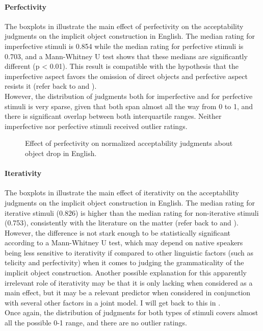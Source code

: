 \paragraph{Perfectivity}
The boxplots in  illustrate the main effect of perfectivity on the acceptability judgments on the implicit object construction in English. The median rating for imperfective stimuli is 0.854 while the median rating for perfective stimuli is 0.703, and a Mann-Whitney U test shows that these medians are significantly different (p < 0.01). This result is compatible with the hypothesis that the imperfective aspect favors the omission of direct objects and perfective aspect resists it (refer back to  and ).\\
However, the distribution of judgments both for imperfective and for perfective stimuli is very sparse, given that both span almost all the way from 0 to 1, and there is significant overlap between both interquartile ranges. Neither imperfective nor perfective stimuli received outlier ratings.

\begin{figure}[htb]
\caption{Effect of perfectivity on normalized acceptability judgments about object drop in English.}
    
\end{figure}

\paragraph{Iterativity}
The boxplots in  illustrate the main effect of iterativity on the acceptability judgments on the implicit object construction in English. The median rating for iterative stimuli (0.826) is higher than the median rating for non-iterative stimuli (0.753), consistently with the literature on the matter (refer back to  and ). However, the difference is not stark enough to be statistically significant according to a Mann-Whitney U test, which may depend on native speakers being less sensitive to iterativity if compared to other linguistic factors (such as telicity and perfectivity) when it comes to judging the grammaticality of the implicit object construction. Another possible explanation for this apparently irrelevant role of iterativity may be that it is only lacking when considered as a main effect, but it may be a relevant predictor when considered in conjunction with several other factors in a joint model. I will get back to this in .\\
Once again, the distribution of judgments for both types of stimuli covers almost all the possible 0-1 range, and there are no outlier ratings.

